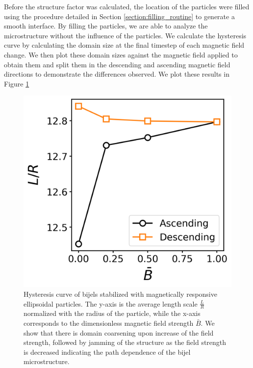 Before the structure factor was calculated, the location of the particles were filled using the procedure detailed in
Section \ref{section:filling_routine} to generate a smooth interface. By filling the particles, we are able to analyze the 
microstructure without the influence of the particles. We calculate the hysteresis curve by calculating the domain 
size at the final timestep of each magnetic field change. We then plot these domain sizes against the magnetic field 
applied to obtain them and split them in the descending and ascending magnetic field directions to demonstrate the 
differences observed. We plot these results in Figure \ref{fig:hysteresis_curve}

\begin{figure} 
    \centering 
    \includegraphics[width=\textwidth]{../figures/results/paper2/hysteresis_curve.png} 
    \caption{Hysteresis curve of bijels stabilized with magnetically responsive ellipsoidal particles. The y-axis is the average length scale $\frac{L}{R}$ normalized with the radius of the particle, while the x-axis corresponds to the dimensionless magnetic field strength $\bar{B}$. We show that there is domain coarsening upon increase of the field strength, followed by jamming of the structure as the field strength is decreased indicating the path dependence of the bijel microstructure.} 
    \label{fig:hysteresis_curve} 
\end{figure}

